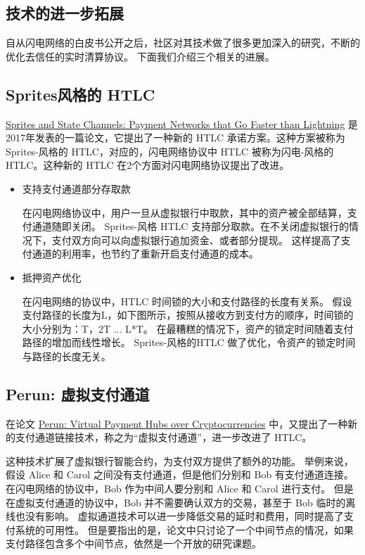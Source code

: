 \begin{appendices}
\section{技术的进一步拓展}
自从闪电网络的白皮书公开之后，社区对其技术做了很多更加深入的研究，不断的优化去信任的实时清算协议。
下面我们介绍三个相关的进展。

\subsection{Sprites风格的 HTLC}
\href{https://arxiv.org/abs/1702.05812}{Sprites and State Channels: Payment Networks that Go Faster than Lightning} 是2017年发表的一篇论文，它提出了一种新的 HTLC 承诺方案。这种方案被称为 Sprites-风格的 HTLC，对应的，闪电网络协议中 HTLC 被称为闪电-风格的HTLC。这种新的 HTLC 在2个方面对闪电网络协议提出了改进。

\begin{itemize}
    \item 支持支付通道部分存取款

    在闪电网络协议中，用户一旦从虚拟银行中取款，其中的资产被全部结算，支付通道随即关闭。
    Sprites-风格 HTLC 支持部分取款。在不关闭虚拟银行的情况下，支付双方向可以向虚拟银行追加资金、或者部分提现。
    这样提高了支付通道的利用率，也节约了重新开启支付通道的成本。

    \item 抵押资产优化

    在闪电网络的协议中，HTLC 时间锁的大小和支付路径的长度有关系。
    假设支付路径的长度为L，如下图所示，按照从接收方到支付方的顺序，时间锁的大小分别为：T，2T ... L*T。
    在最糟糕的情况下，资产的锁定时间随着支付路径的增加而线性增长。
    Sprites-风格的HTLC 做了优化，令资产的锁定时间与路径的长度无关。
\end{itemize}

\subsection{Perun: 虚拟支付通道}
在论文 \href{https://eprint.iacr.org/2017/635.pdf}{Perun: Virtual Payment Hubs over Cryptocurrencies} 中，又提出了一种新的支付通道链接技术，称之为“虚拟支付通道”，进一步改进了 HTLC。

这种技术扩展了虚拟银行智能合约，为支付双方提供了额外的功能。
举例来说，假设 Alice 和 Carol 之间没有支付通道，但是他们分别和 Bob 有支付通道连接。
在闪电网络的协议中，Bob 作为中间人要分别和 Alice 和 Carol 进行支付。
但是在虚拟支付通道的协议中，Bob 并不需要确认双方的交易，甚至于 Bob 临时的离线也没有影响。
虚拟通道技术可以进一步降低交易的延时和费用，同时提高了支付系统的可用性。
但是要指出的是，论文中只讨论了一个中间节点的情况，如果支付路径包含多个中间节点，依然是一个开放的研究课题。


\end{appendices}
